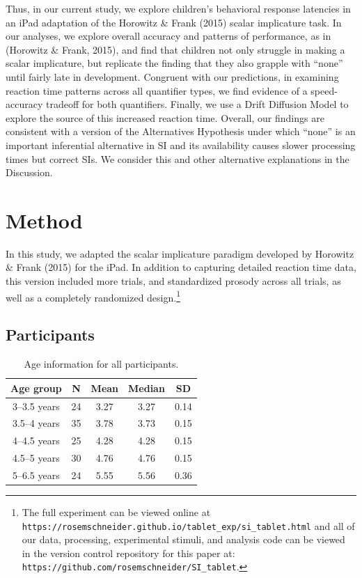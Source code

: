 \documentclass[10pt, letterpaper]{article}
\begin{document}
Thus, in our current study, we explore children's behavioral response
latencies in an iPad adaptation of the Horowitz \& Frank (2015) scalar
implicature task. In our analyses, we explore overall accuracy and
patterns of performance, as in (Horowitz \& Frank, 2015), and find that
children not only struggle in making a scalar implicature, but replicate
the finding that they also grapple with ``none'' until fairly late in
development. Congruent with our predictions, in examining reaction time
patterns across all quantifier types, we find evidence of a
speed-accuracy tradeoff for both quantifiers. Finally, we use a Drift
Diffusion Model to explore the source of this increased reaction time.
Overall, our findings are consistent with a version of the Alternatives
Hypothesis under which ``none'' is an important inferential alternative
in SI and its availability causes slower processing times but correct
SIs. We consider this and other alternative explanations in the
Discussion.

\section{Method}\label{method}

In this study, we adapted the scalar implicature paradigm developed by
Horowitz \& Frank (2015) for the iPad. In addition to capturing detailed
reaction time data, this version included more trials, and standardized
prosody across all trials, as well as a completely randomized
design.\footnote{The full experiment can be viewed online at \texttt{https://rosemschneider.github.io/tablet\_exp/si\_tablet.html} and all of our data, processing, experimental stimuli, and analysis code can be viewed in the version control repository for this paper at: \texttt{https://github.com/rosemschneider/SI\_tablet}.}

\subsection{Participants}\label{participants}

\begin{table}[t]
\centering
\begin{tabular}{c c c c c } 
 \hline
 Age group & N & Mean & Median & SD \\
 \hline
 3--3.5 years & 24 & 3.27 & 3.27 & 0.14\\
 3.5--4 years & 35 & 3.78 & 3.73 & 0.15 \\ 
 4--4.5 years & 25 & 4.28 & 4.28 & 0.15\\
 4.5--5 years & 30 & 4.76 & 4.76 & 0.15 \\
 5--6.5 years & 24 & 5.55 & 5.56 & 0.36 \\
 \hline
\end{tabular}
\caption{Age information for all participants.}
\label{tab:age}
\end{table}
\end{document}
